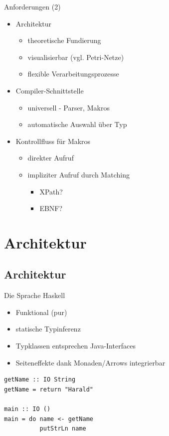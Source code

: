 \documentclass{beamer}
\begin{document}
\begin{frame}{Anforderungen (2)}
  \begin{itemize}
  \item Architektur
    \begin{itemize}
    \item theoretische Fundierung
    \item visualisierbar (vgl. Petri-Netze)
    \item flexible Verarbeitungsprozesse
    \end{itemize} 
  \item Compiler-Schnittstelle
    \begin{itemize}
    \item universell - Parser, Makros
    \item automatische Auswahl über Typ
    \end{itemize}
  \item Kontrollfluss für Makros
    \begin{itemize}
    \item direkter Aufruf
    \item impliziter Aufruf durch Matching
      \begin{itemize}
      \item XPath?
      \item EBNF?
      \end{itemize}
    \end{itemize}    
  \end{itemize}
\end{frame}

\section{Architektur}
\subsection{Architektur}

\begin{frame}[fragile]{Die Sprache Haskell}
  \begin{itemize}
  \item Funktional (pur)
  \item statische Typinferenz
  \item Typklassen entsprechen Java-Interfaces
  \item Seiteneffekte dank Monaden/Arrows integrierbar
  \end{itemize}
\begin{verbatim}
getName :: IO String
getName = return "Harald"

main :: IO ()
main = do name <- getName
          putStrLn name
\end{verbatim}
\end{frame}
\end{document}
